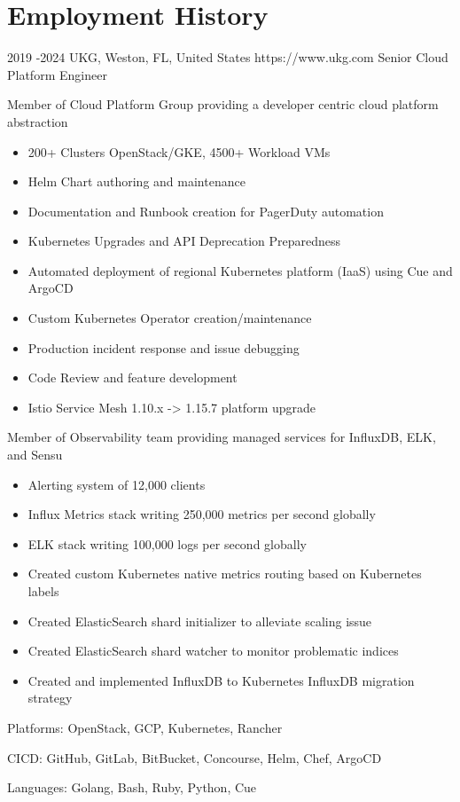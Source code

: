 \documentclass[10pt]{article} %
\begin{document}
\section{Employment History}
\job
{2019 -}{2024}
{UKG, Weston, FL, United States}
{https://www.ukg.com}
{Senior Cloud Platform Engineer}
{\begin{itemize-noindent}
\item{Member of Cloud Platform Group providing a developer centric cloud platform abstraction}
  \begin{itemize}
    \item{200+ Clusters OpenStack/GKE, 4500+ Workload VMs}
    \item{Helm Chart authoring and maintenance}
    \item{Documentation and Runbook creation for PagerDuty automation}
    \item{Kubernetes Upgrades and API Deprecation Preparedness}
    \item{Automated deployment of regional Kubernetes platform (IaaS) using Cue and ArgoCD}
    \item{Custom Kubernetes Operator creation/maintenance}
    \item{Production incident response and issue debugging}
    \item{Code Review and feature development}
    \item{Istio Service Mesh 1.10.x -> 1.15.7 platform upgrade}
  \end{itemize}
\item{Member of Observability team providing managed services for InfluxDB, ELK, and Sensu}
  \begin{itemize}
    \item{Alerting system of 12,000 clients}
    \item{Influx Metrics stack writing 250,000 metrics per second globally}
    \item{ELK stack writing 100,000 logs per second globally}
    \item{Created custom Kubernetes native metrics routing based on Kubernetes labels}
    \item{Created ElasticSearch shard initializer to alleviate scaling issue}
    \item{Created ElasticSearch shard watcher to monitor problematic indices}
    \item{Created and implemented InfluxDB to Kubernetes InfluxDB migration strategy}
  \end{itemize}
\item{Platforms: OpenStack, GCP, Kubernetes, Rancher}
\item{CICD: GitHub, GitLab, BitBucket, Concourse, Helm, Chef, ArgoCD}
\item{Languages: Golang, Bash, Ruby, Python, Cue}
\end{itemize-noindent}}
\end{document}

